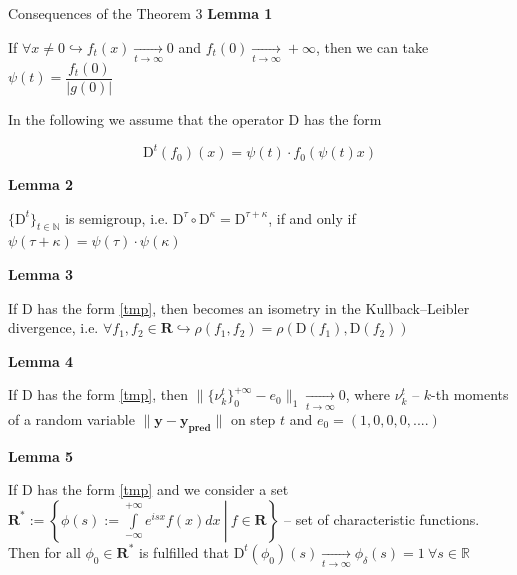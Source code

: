 \documentclass[10pt]{beamer}
\begin{document}
    \begin{frame}{Consequences of the Theorem 3}
        \normalsize{\textcolor{myNewColorA}{\textbf{Lemma 1}}}
        \small

        If 
            $\forall x \neq 0 \hookrightarrow f_t(x) \underset{t \to \infty}{\longrightarrow} 0$ and $f_t(0) \underset{t \to \infty}{\longrightarrow} +\infty$,
        then we can take
            $\psi(t) = \dfrac{f_t(0)}{|g(0)|}$

        In the following we assume that the operator $\text{D}$  has the form  

        \begin{equation}
            \label{tmp}
            \text{D}^t(f_0)(x) = \psi(t) \cdot f_0(\psi(t) x)
        \end{equation}

        \normalsize{\textcolor{myNewColorA}{\textbf{Lemma 2}}}
        \small

        $\{\text{D}^t\}_{t \in \mathbb{N}}$ is semigroup, i.e. $\text{D}^{\tau} \circ \text{D}^{\kappa} = \text{D}^{\tau + \kappa}$, if and only if $\psi(\tau + \kappa) = \psi(\tau) \cdot \psi(\kappa)$

        \normalsize{\textcolor{myNewColorA}{\textbf{Lemma 3}}}
        \small

        If $\text{D}$ has the form \eqref{tmp}, then  becomes an isometry in the Kullback–Leibler divergence, i.e. $\forall f_1, f_2 \in \mathbf{R} \hookrightarrow \rho(f_1, f_2) = \rho(\text{D}(f_1), \text{D}(f_2))$

        \normalsize{\textcolor{myNewColorA}{\textbf{Lemma 4}}}
        \small

        If $\text{D}$ has the form \eqref{tmp}, then $\|\{\nu_k^t\}_0^{+\infty} - e_0\|_1 \underset{t \to \infty}{\longrightarrow} 0$, where $\nu_k^t$ -- $k$-th moments of a random variable $\|\mathbf{y} - \mathbf{y_{\text{pred}}}\|$ on step $t$ and $e_0 = (1, 0, 0, 0, ....)$

        \normalsize{\textcolor{myNewColorA}{\textbf{Lemma 5}}}
        \small

        If $\text{D}$ has the form \eqref{tmp} and we consider a set $\mathbf{R^*} := \left\{\left. \phi(s) := \int\limits_{-\infty}^{+\infty} e^{isx} f(x) dx ~\right|~ f \in \mathbf{R} \right\}$ -- set of characteristic functions. Then for all $\phi_0 \in \mathbf{R^*}$ is fulfilled that $\text{D}^t(\phi_0)(s) \underset{t \to \infty}{\longrightarrow} \phi_{\delta}(s) = 1 ~\forall s \in \mathbb{R}$
    \end{frame}
\end{document}
